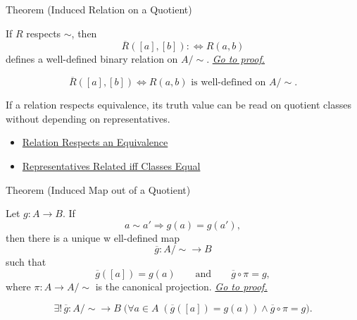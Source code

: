 \begin{theorembox}{Theorem (Induced Relation on a Quotient)}
\begin{theorem}
\label{thm:induced-relation-on-quotient}
If $R$ respects $\sim$, then
\[
\overline{R}([a],[b]):\Longleftrightarrow R(a,b)
\]
defines a well-defined binary relation on $A/{\sim}$.
\hyperref[prf:induced-relation-on-quotient]{\textit{Go to proof.}}
\end{theorem}
\end{theorembox}

\begin{remark*}
\[
\overline{R}([a],[b])\Longleftrightarrow R(a,b)
\text{ is well-defined on } A/{\sim}.
\]
\end{remark*}

\begin{remark*}[Interpretation]
If a relation respects equivalence, its truth value can be read on quotient
classes without depending on representatives.
\end{remark*}

\begin{dependencies}
\begin{itemize}
  \item \hyperref[def:relation-respects-equivalence]{Relation Respects an Equivalence}
  \item \hyperref[prop:representatives-related-iff-classes-equal]{Representatives Related iff Classes Equal}
\end{itemize}
\end{dependencies}

\begin{theorembox}{Theorem (Induced Map out of a Quotient)}
\begin{theorem}
\label{thm:induced-map-out-of-quotient}
Let $g:A\to B$. If
\[
a\sim a'\Longrightarrow g(a)=g(a'),
\]
then there is a unique w
ell-defined map
\[
\overline{g}:A/{\sim}\to B
\]
such that
\[
\overline{g}([a])=g(a)
\qquad\text{and}\qquad
\overline{g}\circ\pi=g,
\]
where $\pi:A\to A/{\sim}$ is the canonical projection.
\hyperref[prf:induced-map-out-of-quotient]{\textit{Go to proof.}}
\end{theorem}
\end{theorembox}

\begin{remark*}
\[
\exists!\,\overline{g}:A/{\sim}\to B\;
\bigl(\forall a\in A\;(\overline{g}([a])=g(a))\land \overline{g}\circ\pi=g\bigr).
\]
\end{remark*}

